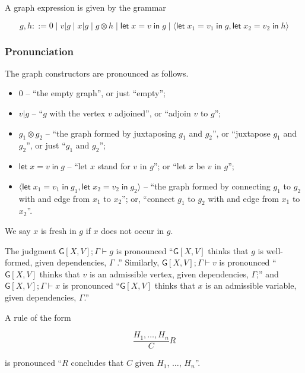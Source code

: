 A graph expression is given by the grammar

\[g,h ::= 0 \;|\; v|g \;|\; x|g \;|\; g \otimes h \; |\;\mathsf{let}\; x = v \; \mathsf{in}\; g \;|\; \langle \mathsf{let}\; x_1 = v_1 \; \mathsf{in}\; g, \mathsf{let}\; x_2 = v_2 \; \mathsf{in}\; h\rangle\]

\hypertarget{pronunciation}{%
\subsubsection{Pronunciation}\label{pronunciation}}

The graph constructors are pronounced as follows.

\begin{itemize}
\item
  \(0\) -- ``the empty graph'', or just ``empty'';
\item
  \(v | g\) -- ``\(g\) with the vertex \(v\) adjoined'', or ``adjoin
  \(v\) to \(g\)'';
\item
  \(g_1 \otimes g_2\) -- ``the graph formed by juxtaposing \(g_1\) and
  \(g_2\)'', or ``juxtapose \(g_1\) and \(g_2\)'', or just ``\(g_1\) and
  \(g_2\)'';
\item
  \(\mathsf{let}\; x = v \; \mathsf{in}\; g\) -- ``let \(x\) stand for
  \(v\) in \(g\)''; or ``let \(x\) be \(v\) in \(g\)'';
\item
  \(\langle \mathsf{let}\; x_1 = v_1 \; \mathsf{in}\; g_1,\mathsf{let}\; x_2 = v_2 \; \mathsf{in}\; g_2\rangle\)
  -- ``the graph formed by connecting \(g_1\) to \(g_2\) with and edge
  from \(x_1\) to \(x_2\)''; or, ``connect \(g_1\) to \(g_2\) with and
  edge from \(x_1\) to \(x_2\)''.
\end{itemize}

We say $x$ is fresh in $g$ if $x$ does not occur in $g$.

The judgment \(\mathsf{G}[X,V]; \Gamma \vdash g\) is pronounced
``\(\mathsf{G}[X,V]\) thinks that \(g\) is well-formed, given
dependencies, \(\Gamma\) .'' Similarly,
\(\mathsf{G}[X,V]; \Gamma \vdash v\) is pronounced ``\(\mathsf{G}[X,V]\)
thinks that \(v\) is an admissible vertex, given dependencies,
\(\Gamma\);'' and \(\mathsf{G}[X,V]; \Gamma \vdash x\) is pronounced
``\(\mathsf{G}[X,V]\) thinks that \(x\) is an admissible variable, given
dependencies, \(\Gamma\).''

A rule of the form

\[\frac{ H_1, \ldots , H_n }{ C }R\]

is pronounced ``\(R\) concludes that \(C\) given \(H_1\), \(\ldots\),
\(H_n\)''.

